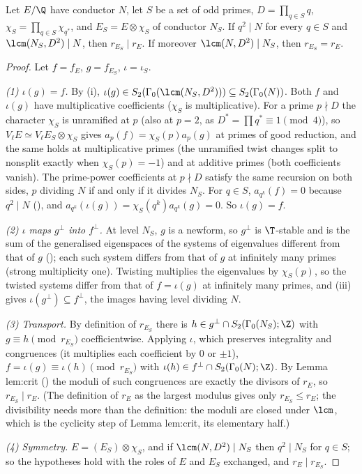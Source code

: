 \begin{theorem}\label{thm:congruence:twist}
Let $E/\Q$ have conductor $N$, let $S$ be a set of odd primes, $D=\prod_{q\in S}q$, $\chi_S=\prod_{q\in S}\chi_{q^*}$, and $E_S=E\otimes\chi_S$ of conductor $N_S$. If $q^2\mid N$ for every $q\in S$ and $\lcm(N_S,D^2)\mid N$,
then $r_{E_S}\mid r_E$. If moreover $\lcm(N,D^2)\mid N_S$, then $r_{E_S}=r_E$.
\end{theorem}

\begin{proof}
Let $f=f_E$, $g=f_{E_S}$, $\iota=\iota_S$.

\emph{(1) $\iota(g)=f$.} By (i), $\iota(g)\in S_2(\Gamma_0(\lcm(N_S,D^2)))\subseteq S_2(\Gamma_0(N))$. Both $f$ and $\iota(g)$ have multiplicative coefficients ($\chi_S$ is multiplicative).
For a prime $p\nmid D$ the character $\chi_S$ is unramified at $p$ (also at $p=2$, as $D^*=\prod q^*\equiv1\pmod4$), so $V_\ell E\simeq V_\ell E_S\otimes\chi_S$ gives $a_p(f)=\chi_S(p)a_p(g)$ at primes of good
reduction, and the same holds at multiplicative primes (the unramified twist changes split to nonsplit exactly when $\chi_S(p)=-1$) and at additive primes (both coefficients vanish). The
prime-power coefficients at $p\nmid D$ satisfy the same recursion on both sides, $p$ dividing $N$ if and only if it divides $N_S$. For $q\in S$, $a_{q^k}(f)=0$ because $q^2\mid N$ (), and
$a_{q^k}(\iota(g))=\chi_S(q^k)a_{q^k}(g)=0$. So $\iota(g)=f$.

\emph{(2) $\iota$ maps $g^\perp$ into $f^\perp$.} At level $N_S$, $g$ is a newform, so $g^\perp$ is $\T$-stable and is the sum of the generalised eigenspaces of the systems of eigenvalues different from that of
$g$ (); each such system differs from that of $g$ at infinitely many primes (strong multiplicity one). Twisting multiplies the eigenvalues by $\chi_S(p)$, so the twisted systems differ from
that of $f=\iota(g)$ at infinitely many primes, and (iii) gives $\iota(g^\perp)\subseteq f^\perp$, the images having level dividing $N$.

\emph{(3) Transport.} By definition of $r_{E_S}$ there is $h\in g^\perp\cap S_2(\Gamma_0(N_S);\Z)$ with $g\equiv h\pmod{r_{E_S}}$ coefficientwise. Applying $\iota$, which preserves integrality and congruences
(it multiplies each coefficient by $0$ or $\pm1$), $f=\iota(g)\equiv\iota(h)\pmod{r_{E_S}}$ with $\iota(h)\in f^\perp\cap S_2(\Gamma_0(N);\Z)$. By Lemma lem:crit () the moduli of such congruences
are exactly the divisors of $r_E$, so $r_{E_S}\mid r_E$. (The definition of $r_E$ as the largest modulus gives only $r_{E_S}\le r_E$; the divisibility needs more than the definition: the
moduli are closed under $\lcm$, which is the cyclicity step of Lemma lem:crit, its elementary half.)

\emph{(4) Symmetry.} $E=(E_S)\otimes\chi_S$, and if $\lcm(N,D^2)\mid N_S$ then $q^2\mid N_S$ for $q\in S$; so the hypotheses hold with the roles of $E$ and $E_S$ exchanged, and $r_E\mid r_{E_S}$.
\end{proof}

